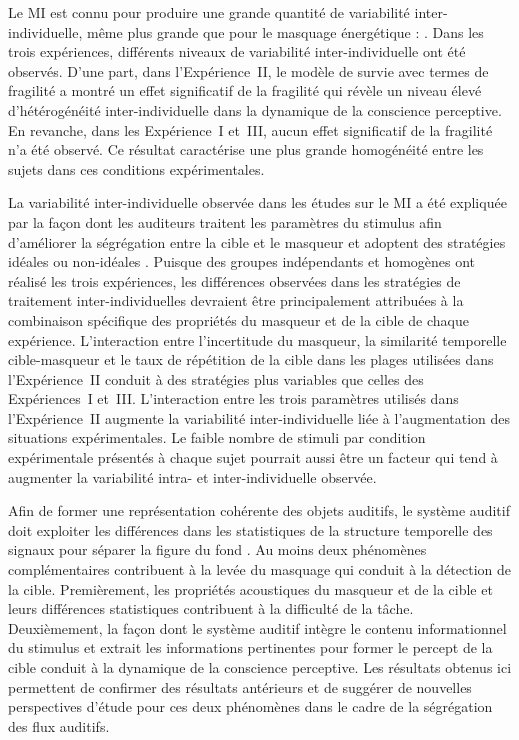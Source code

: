Le MI est connu pour produire une grande quantité de variabilité inter-individuelle, même plus grande que pour le masquage énergétique : \citep{durlach2003informational, durlach2003note, durlach2005informational, kidd2008informationalreview, leek1984learning, neff1995individual}. 
Dans les trois expériences, différents niveaux de variabilité inter-individuelle ont été observés. 
D'une part, dans l'Expérience~II, le modèle de survie avec termes de fragilité a montré un effet significatif de la fragilité qui révèle un niveau élevé d'hétérogénéité inter-individuelle dans la dynamique de la conscience perceptive. 
En revanche, dans les Expérience~I et~III, aucun effet significatif de la fragilité n'a été observé. 
Ce résultat caractérise une plus grande homogénéité entre les sujets dans ces conditions expérimentales. 

La variabilité inter-individuelle observée dans les études sur le MI a été expliquée par la façon dont les auditeurs traitent les paramètres du stimulus afin d'améliorer la ségrégation entre la cible et le masqueur et adoptent des stratégies idéales ou non-idéales \citep{kidd2008informationalreview}. 
Puisque des groupes indépendants et homogènes ont réalisé les trois expériences, les différences observées dans les stratégies de traitement inter-individuelles devraient être principalement attribuées à la combinaison spécifique des propriétés du masqueur et de la cible de chaque expérience. 
L'interaction entre l'incertitude du masqueur, la similarité temporelle cible-masqueur et le taux de répétition de la cible dans les plages utilisées dans l'Expérience~II conduit à des stratégies plus variables que celles des Expériences~I et~III. 
L'interaction entre les trois paramètres utilisés dans l'Expérience~II augmente la variabilité inter-individuelle liée à l'augmentation des situations expérimentales. 
Le faible nombre de stimuli par condition expérimentale présentés à chaque sujet pourrait aussi être un facteur qui tend à augmenter la variabilité intra- et inter-individuelle observée. 

Afin de former une représentation cohérente des objets auditifs, le système auditif doit exploiter les différences dans les statistiques de la structure temporelle des signaux pour séparer la figure du fond \citep{lutfi2013information}. 
Au moins deux phénomènes complémentaires contribuent à la levée du masquage qui conduit à la détection de la cible. 
Premièrement, les propriétés acoustiques du masqueur et de la cible et leurs différences statistiques contribuent à la difficulté de la tâche. 
Deuxièmement, la façon dont le système auditif intègre le contenu informationnel du stimulus et extrait les informations pertinentes pour former le percept de la cible conduit à la dynamique de la conscience perceptive. 
Les résultats obtenus ici permettent de confirmer des résultats antérieurs et de suggérer de nouvelles perspectives d'étude pour ces deux phénomènes dans le cadre de la ségrégation des flux auditifs.

